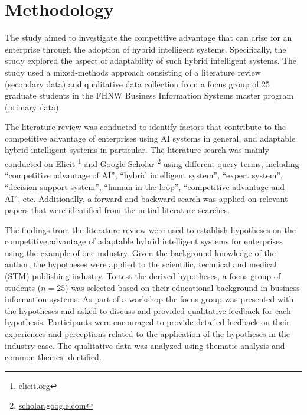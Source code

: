 \section{Methodology}
\label{sec:methods}

The study aimed to investigate the competitive advantage that can arise for an enterprise
through the adoption of hybrid intelligent systems. Specifically, the study explored the aspect of adaptability
of such hybrid intelligent systems. The study used a mixed-methods approach consisting of a literature
review (secondary data) and qualitative data collection from a focus group of 25 graduate students in the
FHNW Business Information Systems master program (primary data).

The literature review was conducted to identify factors that contribute to the competitive advantage
of enterprises using AI systems in general, and adaptable hybrid intelligent systems in particular.
The literature search was mainly conducted on Elicit \footnote{\href{https://elicit.org/}{elicit.org}}
and Google Scholar \footnote{\href{https://scholar.google.com/}{scholar.google.com}} using different
query terms, including ``competitive advantage of AI'', ``hybrid intelligent system'',
``expert system'', ``decision support system'', ``human-in-the-loop'', ``competitive advantage and AI'',
etc. Additionally, a forward and backward search was applied on relevant papers that were identified
from the initial literature searches.

The findings from the literature review were used to establish hypotheses on the competitive advantage
of adaptable hybrid intelligent systems for enterprises using the example of one industry. Given the
background knowledge of the author, the hypotheses were applied to the scientific, technical and medical
(STM) publishing industry. To test the derived hypotheses, a focus group of students ($n = 25$) was selected
based on their educational background in business information systems. As part of a workshop the focus group
was presented with the hypotheses and asked to discuss and provided qualitative feedback for each hypothesis.
Participants were encouraged to provide detailed feedback on their experiences and perceptions related
to the application of the hypotheses in the industry case. The qualitative data was analyzed using
thematic analysis and common themes identified.